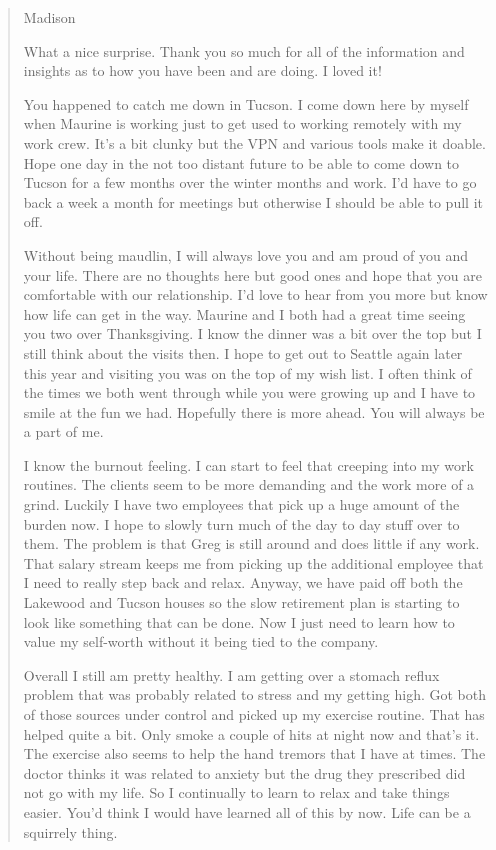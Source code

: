 \begin{quotation}
  Madison

  What a nice surprise. Thank you so much for all of the information and insights as to how you have been and are doing. I loved it!

  You happened to catch me down in Tucson. I come down here by myself when Maurine is working just to get used to working remotely with my work crew. It's a bit clunky but the VPN and various tools make it doable. Hope one day in the not too distant future to be able to come down to Tucson for a few months over the winter months and work. I'd have to go back a week a month for meetings but otherwise I should be able to pull it off.

  Without being maudlin, I will always love you and am proud of you and your life. There are no thoughts here but good ones and hope that you are comfortable with our relationship. I'd love to hear from you more but know how life can get in the way. Maurine and I both had a great time seeing you two over Thanksgiving. I know the dinner was a bit over the top but I still think about the visits then. I hope to get out to Seattle again later this year and visiting you was on the top of my wish list. I often think of the times we both went through while you were growing up and I have to smile at the fun we had. Hopefully there is more ahead. You will always be a part of me.

  I know the burnout feeling. I can start to feel that creeping into my work routines. The clients seem to be more demanding and the work more of a grind. Luckily I have two employees that pick up a huge amount of the burden now. I hope to slowly turn much of the day to day stuff over to them. The problem is that Greg is still around and does little if any work. That salary stream keeps me from picking up the additional employee that I need to really step back and relax. Anyway, we have paid off both the Lakewood and Tucson houses so the slow retirement plan is starting to look like something that can be done. Now I just need to learn how to value my self-worth without it being tied to the company.

  Overall I still am pretty healthy. I am getting over a stomach reflux problem that was probably related to stress and my getting high. Got both of those sources under control and picked up my exercise routine. That has helped quite a bit. Only smoke a couple of hits at night now and that's it. The exercise also seems to help the hand tremors that I have at times. The doctor thinks it was related to anxiety but the drug they prescribed did not go with my life. So I continually to learn to relax and take things easier. You'd think I would have learned all of this by now. Life can be a squirrely thing.


\end{quotation}
